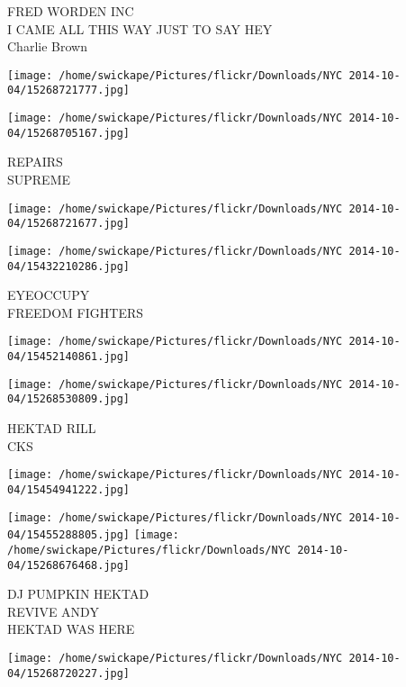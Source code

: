 \documentclass[10pt,letterpaper]{article}
\begin{document}
FRED WORDEN INC\\
I CAME ALL THIS WAY JUST TO SAY HEY\\
Charlie Brown\\
\pagebreak

\texttt{[image: /home/swickape/Pictures/flickr/Downloads/NYC 2014-10-04/15268721777.jpg]}

\vspace{0.25in}
\texttt{[image: /home/swickape/Pictures/flickr/Downloads/NYC 2014-10-04/15268705167.jpg]}

REPAIRS\\
SUPREME\\
\pagebreak

\texttt{[image: /home/swickape/Pictures/flickr/Downloads/NYC 2014-10-04/15268721677.jpg]}

\vspace{0.25in}
\texttt{[image: /home/swickape/Pictures/flickr/Downloads/NYC 2014-10-04/15432210286.jpg]}

EYEOCCUPY\\
FREEDOM FIGHTERS\\
\pagebreak

\texttt{[image: /home/swickape/Pictures/flickr/Downloads/NYC 2014-10-04/15452140861.jpg]}

\vspace{0.25in}
\texttt{[image: /home/swickape/Pictures/flickr/Downloads/NYC 2014-10-04/15268530809.jpg]}

HEKTAD RILL\\
CKS\\
\pagebreak

\texttt{[image: /home/swickape/Pictures/flickr/Downloads/NYC 2014-10-04/15454941222.jpg]}

\vspace{0.25in}
\texttt{[image: /home/swickape/Pictures/flickr/Downloads/NYC 2014-10-04/15455288805.jpg]}
\texttt{[image: /home/swickape/Pictures/flickr/Downloads/NYC 2014-10-04/15268676468.jpg]}

DJ PUMPKIN HEKTAD\\
REVIVE ANDY\\
HEKTAD WAS HERE\\
\pagebreak

\texttt{[image: /home/swickape/Pictures/flickr/Downloads/NYC 2014-10-04/15268720227.jpg]}
\end{document}
